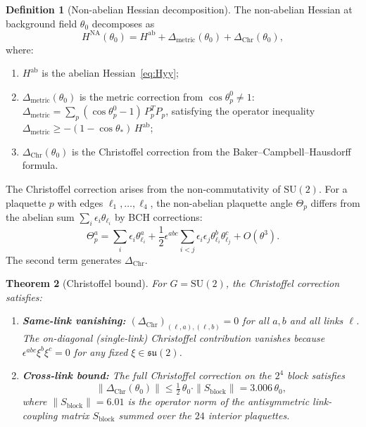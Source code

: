 \documentclass[11pt]{article}
\newtheorem{theorem}{Theorem}[section]
\theoremstyle{definition}
\newtheorem{definition}[theorem]{Definition}
\newcommand{\SU}{\mathrm{SU}}
\newcommand{\su}{\mathfrak{su}}
\begin{document}
\begin{definition}[Non-abelian Hessian decomposition]\label{def:NAhess}
The non-abelian Hessian at background field $\theta_0$ decomposes as
\begin{equation}\label{eq:NAdecomp}
H^{\mathrm{NA}}(\theta_0)
=H^{\mathrm{ab}}+\Delta_{\mathrm{metric}}(\theta_0)
+\Delta_{\mathrm{Chr}}(\theta_0),
\end{equation}
where:
\begin{enumerate}[nosep,label=(\roman*)]
\item $H^{\mathrm{ab}}$ is the abelian Hessian~\eqref{eq:Hyy};
\item $\Delta_{\mathrm{metric}}(\theta_0)$ is the metric correction
from $\cos\theta_p^0\ne 1$: $\Delta_{\mathrm{metric}}
=\sum_p(\cos\theta_p^0-1)\,P_p^T P_p$, satisfying the operator
inequality $\Delta_{\mathrm{metric}}\ge-(1-\cos\theta_*)\,H^{\mathrm{ab}}$;
\item $\Delta_{\mathrm{Chr}}(\theta_0)$ is the Christoffel correction
from the Baker--Campbell--Hausdorff formula.
\end{enumerate}
\end{definition}

The Christoffel correction arises from the non-commutativity of
$\SU(2)$.  For a plaquette $p$ with edges $\ell_1,\ldots,\ell_4$,
the non-abelian plaquette angle $\Theta_p$ differs from the abelian
sum $\sum_i\epsilon_i\theta_{\ell_i}$ by BCH corrections:
\begin{equation}\label{eq:BCH}
\Theta_p^a=\sum_i\epsilon_i\theta_{\ell_i}^a
+\frac{1}{2}\epsilon^{abc}\sum_{i<j}\epsilon_i\epsilon_j
\theta_{\ell_i}^b\theta_{\ell_j}^c+O(\theta^3).
\end{equation}
The second term generates $\Delta_{\mathrm{Chr}}$.

\begin{theorem}[Christoffel bound]\label{thm:antisym}
For $G=\SU(2)$, the Christoffel correction satisfies:
\begin{enumerate}[nosep,label=(\roman*)]
\item \textbf{Same-link vanishing:}
$(\Delta_{\mathrm{Chr}})_{(\ell,a),(\ell,b)}=0$ for all
$a,b$ and all links $\ell$.  The on-diagonal (single-link)
Christoffel contribution vanishes because
$\epsilon^{abc}\xi^b\xi^c=0$ for any fixed $\xi\in\su(2)$.
\item \textbf{Cross-link bound:}
The full Christoffel correction on the $2^4$ block satisfies
\begin{equation}\label{eq:chrbound}
\|\Delta_{\mathrm{Chr}}(\theta_0)\|
\le\tfrac{1}{2}\,\theta_0\cdot\|S_{\mathrm{block}}\|
=3.006\,\theta_0,
\end{equation}
where $\|S_{\mathrm{block}}\|=6.01$ is the operator norm of the
antisymmetric link-coupling matrix $S_{\mathrm{block}}$ summed over
the $24$ interior plaquettes.
\end{enumerate}
\end{theorem}
\end{document}

